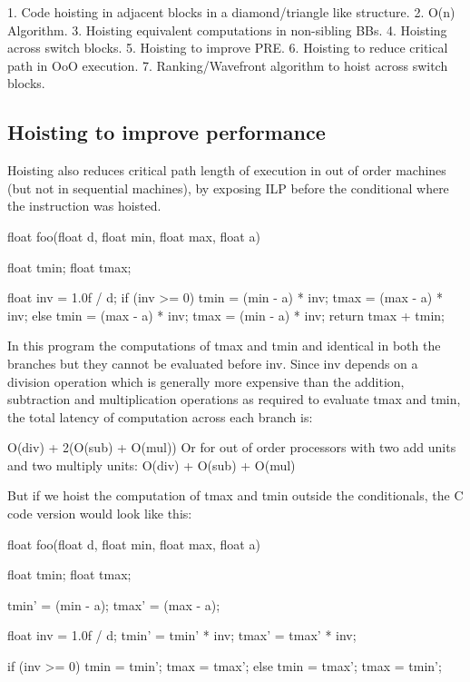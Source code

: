 \begin{section}

1. Code hoisting in adjacent blocks in a diamond/triangle like structure.
2. O(n) Algorithm.
3. Hoisting equivalent computations in non-sibling BBs.
4. Hoisting across switch blocks.
5. Hoisting to improve PRE.
6. Hoisting to reduce critical path in OoO execution.
7. Ranking/Wavefront algorithm to hoist across switch blocks.


\section{Hoisting to improve performance}
Hoisting also reduces critical path length of execution in out of
order machines (but not in sequential machines), by exposing ILP
before the conditional where the instruction was hoisted.

\begin{program}
float foo(float d, float min, float max, float a)
{
  float tmin;
  float tmax;

  float inv = 1.0f / d;
  if (inv >= 0) {
    tmin = (min - a) * inv;
    tmax = (max - a) * inv;
  } else {
    tmin = (max - a) * inv;
    tmax = (min - a) * inv;
  }
  return tmax + tmin;
}

\end{program}

In this program the computations of tmax and tmin and identical in
both the branches but they cannot be evaluated before inv. Since inv
depends on a division operation which is generally more expensive than
the addition, subtraction and multiplication operations as required to
evaluate tmax and tmin, the total latency of computation across each
branch is:

O(div) + 2(O(sub) + O(mul))
Or for out of order processors with two add units and two multiply units:
O(div) + O(sub) + O(mul)

But if we hoist the computation of tmax and tmin outside the
conditionals, the C code version would look like this:
\begin{program}
float foo(float d, float min, float max, float a)
{
  float tmin;
  float tmax;

  tmin' = (min - a);
  tmax' = (max - a);

  float inv = 1.0f / d;
  tmin' = tmin' * inv;
  tmax' = tmax' * inv;

  if (inv >= 0) {
    tmin = tmin';
    tmax = tmax';
  } else {
    tmin = tmax';
    tmax = tmin';
  }

}
\end{program}
\end{section}
